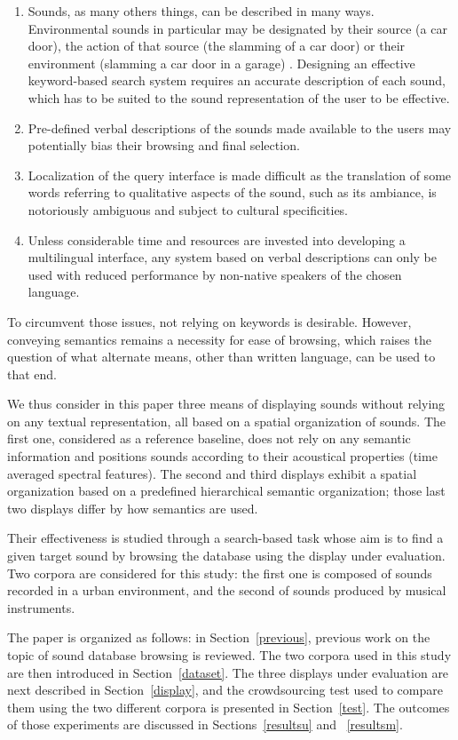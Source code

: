 \documentclass{aes2e}
\begin{document}
\begin{enumerate}
\item Sounds, as many others things, can be described in many ways. Environmental sounds in particular may be designated by their
source (a car door),  the action of that source (the slamming of a car door) or their environment (slamming a car door in a garage) \cite{houix2012lexical, niessen2010categories, brown2011towards}. Designing an effective keyword-based search system requires an accurate description of each sound, which has to be suited to the sound representation of the user to be effective.
\item Pre-defined verbal descriptions of the sounds made available to the users may potentially bias their browsing and final selection.
\item Localization of the query interface is made difficult as the translation of some words referring to qualitative aspects of the sound, such as its ambiance, is notoriously ambiguous and subject to cultural specificities.
\item Unless considerable time and resources are invested into developing a multilingual interface, any system based on verbal descriptions can only be used with reduced performance by non-native speakers of the chosen language.
\end{enumerate}
To circumvent those issues, not relying on keywords is desirable. However, conveying semantics remains a necessity for ease of browsing, which raises the question of what alternate means, other than written language, can be used to that end.

We thus consider in this paper three means of displaying sounds without relying on any textual representation, all based on a spatial organization of sounds. The first one, considered as a reference baseline, does not rely on any semantic information and positions sounds according to their acoustical properties (time averaged spectral features). The second and third displays exhibit a spatial organization based  on a predefined hierarchical semantic organization; those last two displays differ by how semantics are used.

Their effectiveness is studied through a search-based task whose aim is to find a given target sound by browsing the database using the display under evaluation. Two corpora are considered for this study: the first one is composed of sounds recorded in a urban environment, and the second of sounds produced by musical instruments.

The paper is organized as follows: in Section~\ref{previous}, previous work on the topic of sound database browsing is reviewed. The two corpora used in this study are then introduced in Section~\ref{dataset}. The three displays under evaluation are next described in Section~\ref{display}, and the crowdsourcing test used to compare them using the two different corpora is presented in Section~\ref{test}. The outcomes of those experiments are discussed in Sections~\ref{resultsu} and ~\ref{resultsm}.
\end{document}
